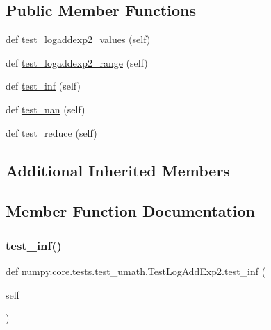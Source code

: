 \subsection*{Public Member Functions}
\begin{DoxyCompactItemize}
\item 
def \hyperlink{classnumpy_1_1core_1_1tests_1_1test__umath_1_1TestLogAddExp2_afff1ca47762cc95e97998b97fbcfb5cf}{test\+\_\+logaddexp2\+\_\+values} (self)
\item 
def \hyperlink{classnumpy_1_1core_1_1tests_1_1test__umath_1_1TestLogAddExp2_aec0ca4200f93186cbf344a9065bf2566}{test\+\_\+logaddexp2\+\_\+range} (self)
\item 
def \hyperlink{classnumpy_1_1core_1_1tests_1_1test__umath_1_1TestLogAddExp2_ad7638bd3cf8c1d9ed833d4316e21df18}{test\+\_\+inf} (self)
\item 
def \hyperlink{classnumpy_1_1core_1_1tests_1_1test__umath_1_1TestLogAddExp2_aaed632eef61c22bf4ea48e95f31f661e}{test\+\_\+nan} (self)
\item 
def \hyperlink{classnumpy_1_1core_1_1tests_1_1test__umath_1_1TestLogAddExp2_a55f9a9b626d1d7c18e34670b8a41669c}{test\+\_\+reduce} (self)
\end{DoxyCompactItemize}
\subsection*{Additional Inherited Members}


\subsection{Member Function Documentation}
\mbox{\label{classnumpy_1_1core_1_1tests_1_1test__umath_1_1TestLogAddExp2_ad7638bd3cf8c1d9ed833d4316e21df18}} 
\subsubsection{\texorpdfstring{test\+\_\+inf()}{test\_inf()}}
{\footnotesize\ttfamily def numpy.\+core.\+tests.\+test\+\_\+umath.\+Test\+Log\+Add\+Exp2.\+test\+\_\+inf (\begin{DoxyParamCaption}\item[{}]{self }\end{DoxyParamCaption})}

